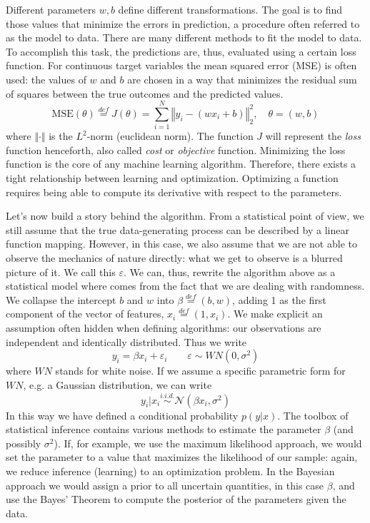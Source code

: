 Different parameters $w, b$ define different transformations. The goal is to find those values that minimize the errors in prediction, a procedure often referred to as  the model to data. There are many different methods to fit the model to data. To accomplish this task, the predictions are, thus, evaluated using a certain loss function. For continuous target variables the mean squared error (MSE) is often used: the values of $w$ and $b$ are chosen in a way that minimizes the residual sum of squares between the true outcomes and the predicted values.
$$\mathrm{MSE}(\theta) \stackrel{\scriptscriptstyle def}{=} J(\theta) = \sum_{i=1}^{N}\left\Vert y_i - (wx_i + b)\right\Vert_{2}^{2}, \quad \theta = (w,b)$$
where $\Vert\cdot\Vert$ is the $L^2$-norm (euclidean norm). The function $J$ will represent the \textit{loss} function henceforth, also called \textit{cost} or \textit{objective} function. Minimizing the loss function is the core of any machine learning algorithm. Therefore, there exists a tight relationship between learning and optimization. Optimizing a function requires being able to compute its derivative with respect to the parameters. 

Let's now build a story behind the algorithm. From a statistical point of view, we still assume that the true data-generating process can be described by a linear function mapping. However, in this case, we also assume that we are not able to observe the mechanics of nature directly: what we get to observe is a blurred picture of it. We call this  $\varepsilon$. We can, thus, rewrite the algorithm above as a statistical model where  comes from the fact that we are dealing with randomness. We collapse the intercept $b$ and $w$ into $\beta \stackrel{\scriptscriptstyle def}{=} (b, w)$, adding 1 as the first component of the vector of features, $x_i \stackrel{\scriptscriptstyle def}{=} (1, x_i)$. We make explicit an assumption often hidden when defining algorithms: our observations are independent and identically distributed. Thus we write
$$y_i = \beta x_i + \varepsilon_i \qquad \varepsilon \sim WN(0, \sigma^2)$$
where $WN$ stands for white noise. If we assume a specific parametric form for $WN$, e.g. a Gaussian distribution, we can write
$$y_i | x_i \stackrel{\scriptscriptstyle i.i.d.}{\sim} \mathcal{N}(\beta x_i, \sigma^2)$$
In this way we have defined a conditional probability $p(y|x)$. The toolbox of statistical inference contains various methods to estimate the parameter $\beta$ (and possibly $\sigma^2$). If, for example, we use the maximum likelihood approach, we would set the parameter to a value that maximizes the likelihood of our sample: again, we reduce inference (learning) to an optimization problem. In the Bayesian approach we would assign a prior to all uncertain quantities, in this case $\beta$, and use the Bayes' Theorem to compute the posterior of the parameters given the data.

